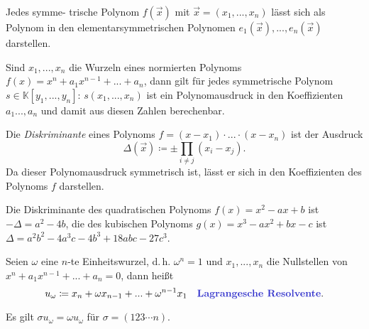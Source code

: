 \documentclass{cheat-sheet}
\newcommand{\K}{\mathbb{K}} %
\begin{document}

\begin{satz}
  Jedes symme- trische Polynom $f(\vec{x})$ mit $\vec{x} = (x_1, ..., x_n)$ lässt sich als Polynom in den elementarsymmetrischen Polynomen $e_1(\vec{x}), ..., e_n(\vec{x})$ darstellen.
\end{satz}

\begin{kor}
  Sind $x_1, ..., x_n$ die Wurzeln eines normierten Polynoms $f(x) = x^n + a_1 x^{n-1} + ... + a_n$, dann gilt für jedes symmetrische Polynom $s \in \K[y_1, ..., y_n]$: $s(x_1, ..., x_n)$ ist ein Polynomausdruck in den Koeffizienten $a_1 ..., a_n$ und damit aus diesen Zahlen berechenbar.
\end{kor}

\begin{defn}
  Die \emph{Diskriminante} eines Polynoms $f = (x - x_1) \cdot ... \cdot (x - x_n)$ ist der Ausdruck
  \[ \Delta (\vec{x}) \coloneqq \pm \prod_{i \not= j} (x_i - x_j). \]
  Da dieser Polynomausdruck symmetrisch ist, lässt er sich in den Koeffizienten des Polynoms $f$ darstellen.
\end{defn}

\begin{bsp}
  Die Diskriminante des quadratischen Polynoms $f(x) = x^2 - ax + b$ ist $- \Delta = a^2 - 4 b$, die des kubischen Polynoms $g(x) = x^3 - a x^2 + b x - c$ ist $\Delta = a^2 b^2 - 4 a^3 c - 4 b^3 + 18 abc - 27 c^3$.
\end{bsp}



\begin{defn}
  Seien $\omega$ eine $n$-te Einheitswurzel, d.\,h. $\omega^n = 1$ und $x_1, ..., x_n$ die Nullstellen von $x^n + a_1 x^{n-1} + ... + a_n = 0$, dann heißt
  \[
    u_{\omega} \coloneqq x_n + \omega x_{n-1} + ... + \omega^{n-1} x_1 \quad
    \text{\emph{Lagrangesche Resolvente}.}
  \]
\end{defn}

\begin{bem}
  Es gilt $\sigma u_{\omega} = \omega u_{\omega}$ für $\sigma = (123 \cdots n)$.
\end{bem}


\end{document}

